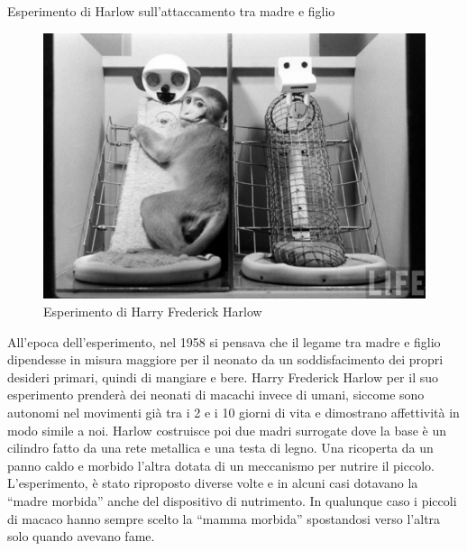 \documentclass[12pt]{book} %
\begin{document}
\needspace{4cm}
\begin{mdframed}[linewidth=1pt]
Esperimento di Harlow sull'attaccamento tra madre e figlio 

\needspace{4cm}
\begin{figure}
  \centering
  \includegraphics[width=0.95\linewidth]{images/Libro-img017.jpg}
  \begin{minipage}{\linewidth}
    \caption{Esperimento di Harry Frederick Harlow}
  \end{minipage}
\end{figure}

All'epoca dell'esperimento, nel 1958 si pensava che il legame tra madre e
figlio dipendesse in misura maggiore per il neonato da un soddisfacimento dei propri desideri primari, quindi di
mangiare e bere. Harry Frederick Harlow per il suo esperimento prenderà dei neonati di macachi invece di umani, siccome
sono autonomi nel movimenti già tra i 2 e i 10 giorni di vita e dimostrano affettività in modo simile a noi. Harlow
costruisce poi due madri surrogate dove la base è un cilindro fatto da una rete metallica e una testa di legno. Una
ricoperta da un panno caldo e morbido l'altra dotata di un meccanismo per nutrire il piccolo.
L'esperimento, è stato riproposto diverse volte e in alcuni casi dotavano la “madre morbida” anche
del dispositivo di nutrimento. In qualunque caso i piccoli di macaco hanno sempre scelto la “mamma morbida” spostandosi
verso l'altra solo quando avevano fame.


\end{mdframed}
\end{document}
